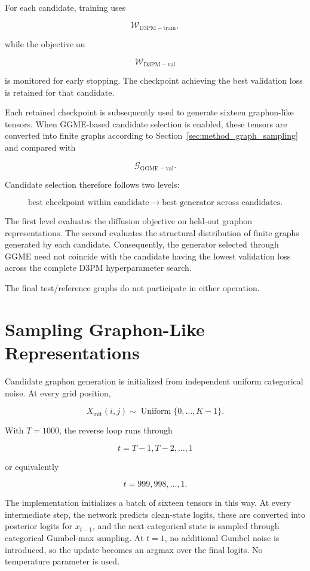For each candidate, training uses

\[
\mathcal{W}_{\mathrm{D3PM-train}},
\]

while the objective on

\[
\mathcal{W}_{\mathrm{D3PM-val}}
\]

is monitored for early stopping. The checkpoint achieving the best validation loss is retained for that candidate.

Each retained checkpoint is subsequently used to generate sixteen graphon-like tensors. When GGME-based candidate selection is enabled, these tensors are converted into finite graphs according to Section~\ref{sec:method_graph_sampling} and compared with

\[
\mathcal{G}_{\mathrm{GGME-val}}.
\]

Candidate selection therefore follows two levels:

\[
\text{best checkpoint within candidate}
\longrightarrow
\text{best generator across candidates}.
\]

The first level evaluates the diffusion objective on held-out graphon representations. The second evaluates the structural distribution of finite graphs generated by each candidate. Consequently, the generator selected through GGME need not coincide with the candidate having the lowest validation loss across the complete D3PM hyperparameter search.

The final test/reference graphs do not participate in either operation.


\section{Sampling Graphon-Like Representations}
\label{sec:method_d3pm_sampling}

Candidate graphon generation is initialized from independent uniform categorical noise. At every grid position,

\[
X_{\mathrm{init}}(i,j)
\sim
\operatorname{Uniform}
\{0,\ldots,K-1\}.
\]

With \(T=1000\), the reverse loop runs through

\[
t=T-1,T-2,\ldots,1
\]

or equivalently

\[
t=999,998,\ldots,1.
\]

The implementation initializes a batch of sixteen tensors in this way. At every intermediate step, the network predicts clean-state logits, these are converted into posterior logits for \(x_{t-1}\), and the next categorical state is sampled through categorical Gumbel-max sampling. At \(t=1\), no additional Gumbel noise is introduced, so the update becomes an argmax over the final logits. No temperature parameter is used.

